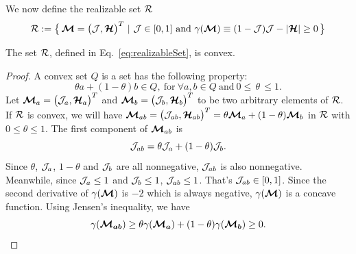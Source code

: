 We now define the realizable set $\mathcal{R}$
\begin{equation}
  \mathcal{R}:=\big\{\,\boldsymbol{\mathcal{M}}=\big(\mathcal{J},\boldsymbol{\mathcal{H}}\big)^{T}~|~\mathcal{J}\in[0,1]~\text{and}~\gamma(\boldsymbol{\mathcal{M}})\equiv(1-\mathcal{J})\mathcal{J}-|\boldsymbol{\mathcal{H}}|\ge0\,\big\}
  \label{eq:realizableSet}
\end{equation}

\begin{lemma}
  The set $\mathcal{R}$, defined in Eq.~\eqref{eq:realizableSet}, is convex.  
\end{lemma}
\begin{proof}
  A convex set $Q$ is a set has the following property: 
  \begin{equation*}
  \theta a + (1-\theta)b \in Q,~\text{for}~\forall a, b \in Q~\text{and}~0\leq\,\theta\,\leq1. 
  \end{equation*} 
  Let $\boldsymbol{\mathcal{M}}_{a}=\big(\mathcal{J}_{a},\boldsymbol{\mathcal{H}}_{a}\big)^{T}$ and $\boldsymbol{\mathcal{M}}_{b}=\big(\mathcal{J}_{b},\boldsymbol{\mathcal{H}}_{b}\big)^{T}$ to be two arbitrary elements of $\mathcal{R}$.
  If $\mathcal{R}$ is convex, we will have $\boldsymbol{\mathcal{M}}_{ab} = \big(\mathcal{J}_{ab},\boldsymbol{\mathcal{H}}_{ab}\big)^{T} = \theta \boldsymbol{\mathcal{M}}_{a} + (1-\theta)\boldsymbol{\mathcal{M}}_{b}$ in $\mathcal{R}$ with $0\leq\theta\leq1$.
  The first component of $\boldsymbol{\mathcal{M}}_{ab}$ is
  \begin{equation*}
  \mathcal{J}_{ab} = \theta \mathcal{J}_{a} + (1-\theta)\mathcal{J}_{b}.
  \end{equation*}
  Since $\theta$, $\mathcal{J}_{a}$, $1-\theta$ and $\mathcal{J}_{b}$ are all nonnegative, $\mathcal{J}_{ab}$ is also nonnegative.
  Meanwhile, since $\mathcal{J}_{a}\leq1$ and $\mathcal{J}_{b}\leq1$, $\mathcal{J}_{ab}\leq1$.
  That's $\mathcal{J}_{ab} \in [0,1]$.
  Since the second derivative of $\gamma(\boldsymbol{\mathcal{M}})$ is $-2$ which is always negative, $\gamma(\boldsymbol{\mathcal{M}})$ is a concave function.
  Using Jensen's inequality, we have
  \begin{equation*}
  \gamma(\boldsymbol{\mathcal{M}_{ab}}) \geq \theta\gamma(\boldsymbol{\mathcal{M}_{a}}) + (1-\theta)\gamma(\boldsymbol{\mathcal{M}_{b}}) \ge0.
  \end{equation*}
\end{proof}

